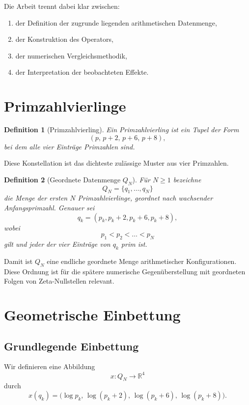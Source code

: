 \documentclass[11pt,a4paper,draft]{article}
\newtheorem{definition}{Definition}[section]
\newcommand{\R}{\mathbb{R}}
\begin{document}
	Die Arbeit trennt dabei klar zwischen:
	\begin{enumerate}[label=(\roman*)]
		\item der Definition der zugrunde liegenden arithmetischen Datenmenge,
		\item der Konstruktion des Operators,
		\item der numerischen Vergleichsmethodik,
		\item der Interpretation der beobachteten Effekte.
	\end{enumerate}
	
	\section{Primzahlvierlinge}
	
	\begin{definition}[Primzahlvierling]
		Ein Primzahlvierling ist ein Tupel der Form
		\[
		(p,\,p+2,\,p+6,\,p+8),
		\]
		bei dem alle vier Einträge Primzahlen sind.
	\end{definition}
	
	Diese Konstellation ist das dichteste zulässige Muster aus vier Primzahlen.
	
	\begin{definition}[Geordnete Datenmenge \(Q_N\)]
		Für \(N \ge 1\) bezeichne
		\[
		Q_N=\{q_1,\dots,q_N\}
		\]
		die Menge der ersten \(N\) Primzahlvierlinge, geordnet nach wachsender Anfangsprimzahl. Genauer sei
		\[
		q_k=(p_k,p_k+2,p_k+6,p_k+8),
		\]
		wobei
		\[
		p_1 < p_2 < \dots < p_N
		\]
		gilt und jeder der vier Einträge von \(q_k\) prim ist.
	\end{definition}
	
	Damit ist \(Q_N\) eine endliche geordnete Menge arithmetischer Konfigurationen. Diese Ordnung ist für die spätere numerische Gegenüberstellung mit geordneten Folgen von Zeta-Nullstellen relevant.
	
	\section{Geometrische Einbettung}
	
	\subsection{Grundlegende Einbettung}
	
	Wir definieren eine Abbildung
	\[
	x:Q_N \to \R^4
	\]
	durch
	\[
	x(q_k)
	=
	\bigl(
	\log p_k,\,
	\log(p_k+2),\,
	\log(p_k+6),\,
	\log(p_k+8)
	\bigr).
	\]
	
\end{document}
